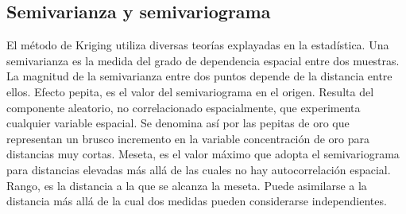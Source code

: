 \subsection{Semivarianza y semivariograma}
El método de Kriging utiliza diversas teorías explayadas en la estadística.
Una semivarianza es la medida del grado de dependencia espacial entre dos
muestras. La magnitud de la semivarianza entre dos puntos depende de la
distancia entre ellos. Efecto pepita,  es el valor del semivariograma en
el origen. Resulta del componente aleatorio, no correlacionado espacialmente,
que experimenta cualquier variable espacial. Se denomina así por las pepitas
de oro que representan un brusco incremento en la variable concentración de
oro para distancias muy cortas.
Meseta, es el valor máximo que adopta el semivariograma para distancias
elevadas más allá de las cuales no hay autocorrelación espacial.
Rango, es la distancia a la que se alcanza la meseta. Puede asimilarse a
la distancia más allá de la cual dos medidas pueden considerarse independientes.
